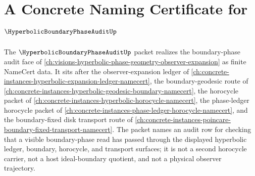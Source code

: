 \chapter{A Concrete Naming Certificate for $\HyperbolicBoundaryPhaseAuditUp$}
\label{ch:concrete-instances-hyperbolic-boundary-phase-audit-namecert}

The $\HyperbolicBoundaryPhaseAuditUp$ packet realizes the boundary-phase audit face of \autoref{ch:visions-hyperbolic-phase-geometry-observer-expansion} as finite NameCert data. It sits after the observer-expansion ledger of \autoref{ch:concrete-instances-hyperbolic-expansion-ledger-namecert}, the boundary-geodesic route of \autoref{ch:concrete-instances-hyperbolic-geodesic-boundary-namecert}, the horocycle packet of \autoref{ch:concrete-instances-hyperbolic-horocycle-namecert}, the phase-ledger horocycle packet of \autoref{ch:concrete-instances-phase-ledger-horocycle-namecert}, and the boundary-fixed disk transport route of \autoref{ch:concrete-instances-poincare-boundary-fixed-transport-namecert}. The packet names an audit row for checking that a visible boundary-phase read has passed through the displayed hyperbolic ledger, boundary, horocycle, and transport surfaces; it is not a second horocycle carrier, not a host ideal-boundary quotient, and not a physical observer trajectory.



